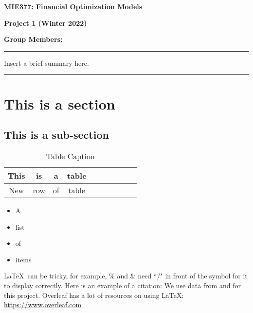 \documentclass[10pt]{article}
\begin{document}
{\centering \textbf{\Large{MIE377: Financial Optimization Models}} \par\vspace*{0.15cm}
\textbf{\large{Project 1 (Winter 2022)}}\par\vspace*{0.15cm}
\textbf{Group Members: \centering}\par 
}
\vspace*{0.2cm}
\hrule
\vspace*{0.2cm}

Insert a brief summary here.
\vspace*{0.1cm}
\hrule
\vspace*{0.1cm}

\section{This is a section}

\subsection{This is a sub-section}


\begin{table}[!htbp]
\footnotesize
\caption{Table Caption}
\centering
\begin{tabular}{c c c c c c c c c c}
\hline 
\rule{0pt}{3.5ex}This & is & a & table \\[1.5ex]
\hline\hline
\rule{0pt}{3.5ex}New & row & of & table \\[1.5ex]
\hline 
\end{tabular}
\label{tab:example}
\end{table}

\begin{itemize}
\itemsep -0.1em
    \item A
    \item list
    \item of
    \item items
\end{itemize}

\noindent \LaTeX \ can be tricky, for example, \% and \& need ``/" in front of the symbol for it to display correctly. Here is an example of a citation: We use data from \cite{French2016Data} and \cite{QuandlWIKI} for this project.
\newline
Overleaf has a lot of resources on using \LaTeX: \url{https://www.overleaf.com}

\printbibliography
\end{document}
